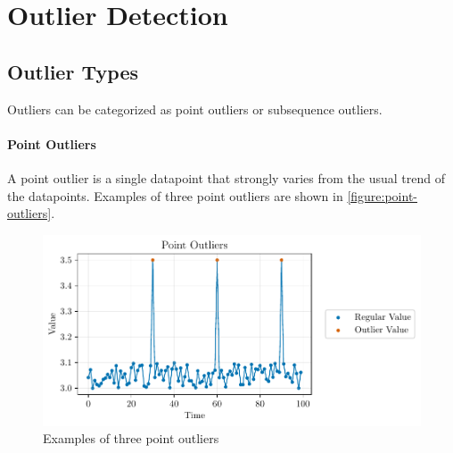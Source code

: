 \chapter{Outlier Detection}\label{chapter:outlier-detection}
\section{Outlier Types}\label{section:outlier-detection}
Outliers can be categorized as point outliers or subsequence outliers.
\subsubsection{Point Outliers}
A point outlier is a single datapoint that strongly varies from the usual trend of the datapoints. \cite{blazquez-garciaReviewOutlierAnomaly2020} Examples of three point outliers are shown in \autoref{figure:point-outliers}. 
\begin{figure}[h]
  \centering
  \includegraphics{./plots/pdfs/point_outliers.pdf}
  \caption{Examples of three point outliers}
  \label{figure:point-outliers}
\end{figure}

